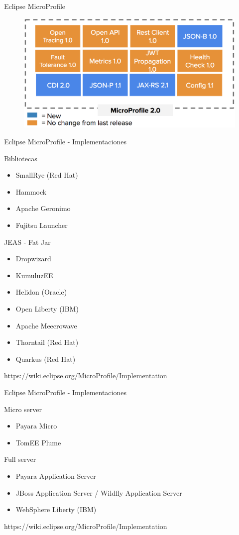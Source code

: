 \documentclass{beamer}
\begin{document}
\begin{frame}{Eclipse MicroProfile}
\begin{figure}
	\centering
	\includegraphics[width=\linewidth]{Images/mp5}
\end{figure}
\end{frame}


\begin{frame}{Eclipse MicroProfile - Implementaciones}

Bibliotecas
\begin{itemize}
	\item SmallRye (Red Hat)
	\item Hammock
	\item Apache Geronimo
	\item Fujitsu Launcher
\end{itemize}
	
JEAS - Fat Jar
\begin{itemize}
	\item Dropwizard
	\item KumuluzEE
	\item Helidon (Oracle)
	\item Open Liberty (IBM)
	\item Apache Meecrowave
	\item Thorntail (Red Hat)
	\item Quarkus (Red Hat)
\end{itemize}

https://wiki.eclipse.org/MicroProfile/Implementation

\end{frame}
\begin{frame}{Eclipse MicroProfile - Implementaciones}

Micro server
\begin{itemize}
	\item Payara Micro
	\item TomEE Plume
\end{itemize}

Full server
\begin{itemize}
	\item Payara Application Server
	\item JBoss Application Server / Wildfly Application Server
	\item WebSphere Liberty (IBM)
\end{itemize}

https://wiki.eclipse.org/MicroProfile/Implementation
\end{frame}
\end{document}
